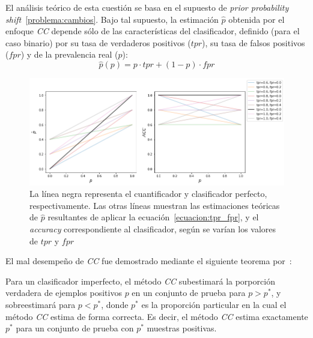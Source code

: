 El análisis teórico de esta cuestión se basa en el supuesto de {\it prior
probability shift\/}~\ref{problema:cambios}. Bajo tal supuesto, la estimación
$\hat p$ obtenida por el enfoque {\it CC\/} depende sólo de las características
del clasificador, definido (para el caso binario) por su tasa de verdaderos
positivos ($tpr$), su tasa de falsos positivos ($fpr$) y de la prevalencia real
($p$):
\begin{equation}\label{ecuacion:tpr_fpr}
    \hat p(p) = p \cdot {tpr} + (1-p) \cdot {fpr}
\end{equation}
\begin{figure}[h]
    \includegraphics[width=\textwidth]{../plots_teoria/cc_tpr_fpr.png}
    \caption{La línea negra representa el cuantificador y clasificador perfecto,
    respectivamente. Las otras líneas muestran las estimaciones teóricas de
    $\hat p$ resultantes de aplicar la ecuación~\ref{ecuacion:tpr_fpr}, y el
    {\it accuracy\/} correspondiente al clasificador, según se varían los
    valores de $tpr$ y $fpr$}\label{fig:cc_tpr_fpr}
\end{figure}

El mal desempeño de {\it CC\/} fue demostrado mediante el siguiente teorema
por~\citeauthor{forman2008quantifying}:

\begin{theorem}
    \citep[p.169]{forman2008quantifying}\label{teorema:forman} Para un
    clasificador imperfecto, el método {\it CC\/} subestimará la porporción
    verdadera de ejemplos positivos $p$ en un conjunto de prueba para $p>p^*$, y
    sobreestimará para $p<p^*$, donde $p^*$ es la proporción particular en la
    cual el método {\it CC\/} estima de forma correcta. Es decir, el método {\it
    CC\/} estima exactamente $p^*$ para un conjunto de prueba con $p^*$ muestras
    positivas.
\end{theorem}

